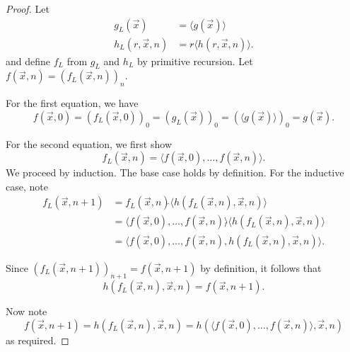 \documentclass{article}
\newcommand{\tuple}[1]{\langle #1 \rangle}
\newcommand{\concat}{\mathbin{\widehat{}}}
\begin{document}
  \begin{proof}
    Let
    \begin{align*}
      g_L(\vec x) &= \tuple{g(\vec x)}\\
      h_L(r, \vec x, n) &= r \concat \tuple{h(r, \vec x, n)}.
    \end{align*}
    and define $f_L$ from $g_L$ and $h_L$ by primitive recursion. Let $f(\vec x, n) = (f_L(\vec x, n))_n$.

    For the first equation, we have
    \[
      f(\vec x, 0) = (f_L(\vec x, 0))_0
      = (g_L(\vec x))_0
      = (\tuple{g(\vec x)})_0
      = g(\vec x).
    \]

    For the second equation, we first show
    \[
      f_L(\vec x, n) = \tuple{f(\vec x, 0), \ldots, f(\vec x, n)}.
    \]
    We proceed by induction.  The base case holds by definition.
    For the inductive case, note
    \begin{align*}
      f_L(\vec x, n+1)
      &= f_L(\vec x, n) \concat \tuple{h(f_L(\vec x, n), \vec x, n)}\\
      &= \tuple{f(\vec x, 0), \ldots, f(\vec x, n)} \concat \tuple{h(f_L(\vec x, n), \vec x, n)}\\
      &= \tuple{f(\vec x, 0), \ldots, f(\vec x, n), h(f_L(\vec x, n), \vec x, n)}.
    \end{align*}

    Since $(f_L(\vec x, n+1))_{n+1} = f(\vec x, n+1)$ by definition, it follows that
    \[
      h(f_L(\vec x, n), \vec x, n) = f(\vec x, n+1).
    \]

    Now note
    \[
      f(\vec x, n+1) = h(f_L(\vec x, n), \vec x, n) = h(\tuple{f(\vec x, 0), \ldots, f(\vec x, n)}, \vec x, n)
    \]
    as required.
  \end{proof}
\end{document}
